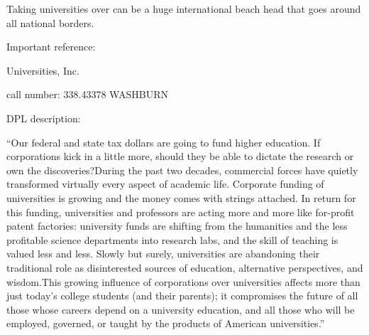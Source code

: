 Taking universities over can be a huge international beach head that
goes around all national borders.

Important reference:

Universities, Inc.

call number: 338.43378 WASHBURN

DPL description:

``Our federal and state tax dollars are going to fund higher education.
If corporations kick in a little more, should they be able to dictate
the research or own the discoveries?During the past two decades,
commercial forces have quietly transformed virtually every aspect of
academic life. Corporate funding of universities is growing and the
money comes with strings attached. In return for this funding,
universities and professors are acting more and more like for-profit
patent factories: university funds are shifting from the humanities and
the less profitable science departments into research labs, and the
skill of teaching is valued less and less. Slowly but surely,
universities are abandoning their traditional role as disinterested
sources of education, alternative perspectives, and wisdom.This growing
influence of corporations over universities affects more than just
today's college students (and their parents); it compromises the future
of all those whose careers depend on a university education, and all
those who will be employed, governed, or taught by the products of
American universities.''
